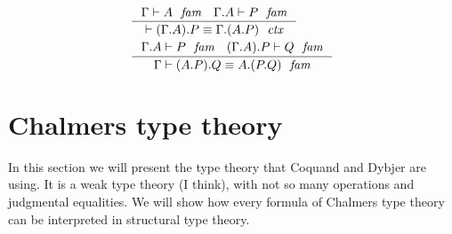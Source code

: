 \begin{align}
& \inference
  {\jfam{\Gamma}{A}
   \jfam{{\Gamma}{A}}{P}}
  {\jctxeq{\ctxext{{\Gamma}{A}}{P}}{\ctxext{\Gamma}{{A}{P}}}}\\
& \inference
  {\jfam{{\Gamma}{A}}{P}
   \jfam{{{\Gamma}{A}}{P}}{Q}}
  {\jfameq{\Gamma}{\ctxext{{A}{P}}{Q}}{\ctxext{A}{{P}{Q}}}}
\end{align}


\section{Chalmers type theory}
In this section we will present the type theory that Coquand and Dybjer are using.
It is a weak type theory (I think), with not so many operations and judgmental equalities.
We will show how every formula of Chalmers type theory can be interpreted in
structural type theory.
